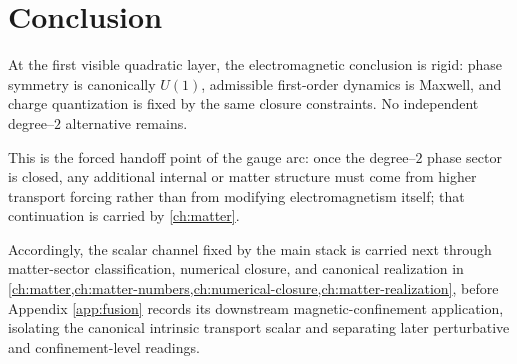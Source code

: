 \section{Conclusion}
\label{sec:em-conclusion}
At the first visible quadratic layer, the electromagnetic conclusion is
rigid: phase symmetry is canonically \(U(1)\), admissible first-order
dynamics is Maxwell, and charge quantization is fixed by the same closure
constraints. No independent degree--\(2\) alternative remains.

This is the forced handoff point of the gauge arc: once the degree--\(2\)
phase sector is closed, any additional internal or matter structure must
come from higher transport forcing rather than from modifying
electromagnetism itself; that continuation is carried by
\cref{ch:matter}.

Accordingly, the scalar channel fixed by the main stack is carried
next through matter-sector classification, numerical closure, and
canonical realization in
\cref{ch:matter,ch:matter-numbers,ch:numerical-closure,ch:matter-realization},
before Appendix \cref{app:fusion} records its downstream
magnetic-confinement application, isolating the canonical intrinsic
transport scalar and separating later perturbative and
confinement-level readings.